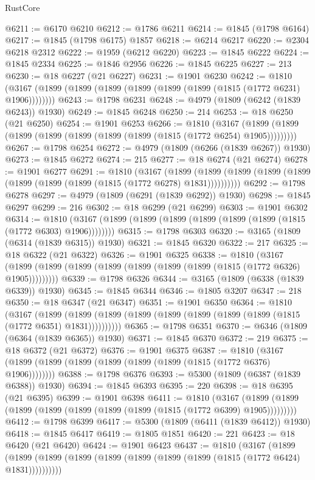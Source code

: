 \begin{lexlean}{RustCore}
\begin{coremodule}
@6211 := @6170 @6210
@6212 := @1786 @6211
@6214 := @1845 (@1798 @6164)
@6217 := @1845 (@1798 @6175) @1857
@6218 := @6214 @6217
@6220 := @2304 @6218 @2312
@6222 := @1959 (@6212 @6220)
@6223 := @1845 @6222
@6224 := @1845 @2334
@6225 := @1846 @2956
@6226 := @1845 @6225
@6227 := 213
@6230 := @18 @6227 (@21 @6227)
@6231 := @1901 @6230
@6242 := @1810 (@3167 (@1899 (@1899 (@1899 (@1899 (@1899 (@1899 (@1815 (@1772 @6231) @1906))))))))
@6243 := @1798 @6231
@6248 := @4979 (@1809 (@6242 (@1839 @6243)) @1930)
@6249 := @1845 @6248
@6250 := 214
@6253 := @18 @6250 (@21 @6250)
@6254 := @1901 @6253
@6266 := @1810
    (@3167 (@1899 (@1899 (@1899 (@1899 (@1899 (@1899 (@1899 (@1815 (@1772 @6254) @1905)))))))))
@6267 := @1798 @6254
@6272 := @4979 (@1809 (@6266 (@1839 @6267)) @1930)
@6273 := @1845 @6272
@6274 := 215
@6277 := @18 @6274 (@21 @6274)
@6278 := @1901 @6277
@6291 := @1810
    (@3167
      (@1899 (@1899 (@1899 (@1899 (@1899 (@1899 (@1899 (@1899 (@1815 (@1772 @6278) @1831))))))))))
@6292 := @1798 @6278
@6297 := @4979 (@1809 (@6291 (@1839 @6292)) @1930)
@6298 := @1845 @6297
@6299 := 216
@6302 := @18 @6299 (@21 @6299)
@6303 := @1901 @6302
@6314 := @1810 (@3167 (@1899 (@1899 (@1899 (@1899 (@1899 (@1899 (@1815 (@1772 @6303) @1906))))))))
@6315 := @1798 @6303
@6320 := @3165 (@1809 (@6314 (@1839 @6315)) @1930)
@6321 := @1845 @6320
@6322 := 217
@6325 := @18 @6322 (@21 @6322)
@6326 := @1901 @6325
@6338 := @1810
    (@3167 (@1899 (@1899 (@1899 (@1899 (@1899 (@1899 (@1899 (@1815 (@1772 @6326) @1905)))))))))
@6339 := @1798 @6326
@6344 := @3165 (@1809 (@6338 (@1839 @6339)) @1930)
@6345 := @1845 @6344
@6346 := @1805 @3207
@6347 := 218
@6350 := @18 @6347 (@21 @6347)
@6351 := @1901 @6350
@6364 := @1810
    (@3167
      (@1899 (@1899 (@1899 (@1899 (@1899 (@1899 (@1899 (@1899 (@1815 (@1772 @6351) @1831))))))))))
@6365 := @1798 @6351
@6370 := @6346 (@1809 (@6364 (@1839 @6365)) @1930)
@6371 := @1845 @6370
@6372 := 219
@6375 := @18 @6372 (@21 @6372)
@6376 := @1901 @6375
@6387 := @1810 (@3167 (@1899 (@1899 (@1899 (@1899 (@1899 (@1899 (@1815 (@1772 @6376) @1906))))))))
@6388 := @1798 @6376
@6393 := @5300 (@1809 (@6387 (@1839 @6388)) @1930)
@6394 := @1845 @6393
@6395 := 220
@6398 := @18 @6395 (@21 @6395)
@6399 := @1901 @6398
@6411 := @1810
    (@3167 (@1899 (@1899 (@1899 (@1899 (@1899 (@1899 (@1899 (@1815 (@1772 @6399) @1905)))))))))
@6412 := @1798 @6399
@6417 := @5300 (@1809 (@6411 (@1839 @6412)) @1930)
@6418 := @1845 @6417
@6419 := @1805 @1851
@6420 := 221
@6423 := @18 @6420 (@21 @6420)
@6424 := @1901 @6423
@6437 := @1810
    (@3167
      (@1899 (@1899 (@1899 (@1899 (@1899 (@1899 (@1899 (@1899 (@1815 (@1772 @6424) @1831))))))))))

\end{coremodule}
\end{lexlean}
